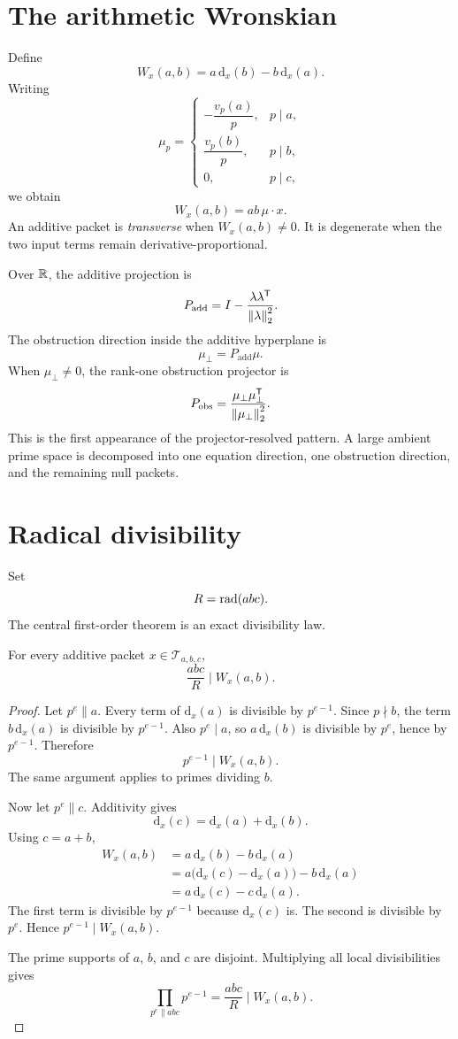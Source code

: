 \section{The arithmetic Wronskian}
Define
\[
 \boxed{
 W_x(a,b)
 =a\,\mathrm d_x(b)-b\,\mathrm d_x(a).
 }
\]
Writing
\[
 \mu_p=
 \begin{cases}
 -\dfrac{v_p(a)}p,&p\mid a,\\[6pt]
 \dfrac{v_p(b)}p,&p\mid b,\\[6pt]
 0,&p\mid c,
 \end{cases}
\]
we obtain
\[
 W_x(a,b)=ab\,\mu\cdot x.
\]
An additive packet is \emph{transverse} when $W_x(a,b)\neq0$. It is degenerate when the two input terms remain derivative-proportional.

Over $\mathbb R$, the additive projection is
\[
 P_{\mathrm{add}}
 =
 I-
 \frac{\lambda\lambda^{\mathsf T}}{\left\lVert\lambda\right\rVert_2^2}.
\]
The obstruction direction inside the additive hyperplane is
\[
 \mu_\perp=P_{\mathrm{add}}\mu.
\]
When $\mu_\perp\neq0$, the rank-one obstruction projector is
\[
 P_{\mathrm{obs}}
 =
 \frac{\mu_\perp\mu_\perp^{\mathsf T}}
 {\left\lVert\mu_\perp\right\rVert_2^2}.
\]
This is the first appearance of the projector-resolved pattern. A large ambient prime space is decomposed into one equation direction, one obstruction direction, and the remaining null packets.

\section{Radical divisibility}
Set
\[
 R=\operatorname{rad}(abc).
\]
The central first-order theorem is an exact divisibility law.

\begin{theorem}
For every additive packet $x\in\mathcal T_{a,b,c}$,
\[
 \boxed{
 \frac{abc}{R}\mid W_x(a,b).
 }
\]
\end{theorem}

\begin{proof}
Let $p^e\parallel a$. Every term of $\mathrm d_x(a)$ is divisible by $p^{e-1}$. Since $p\nmid b$, the term $b\,\mathrm d_x(a)$ is divisible by $p^{e-1}$. Also $p^e\mid a$, so $a\,\mathrm d_x(b)$ is divisible by $p^e$, hence by $p^{e-1}$. Therefore
\[
 p^{e-1}\mid W_x(a,b).
\]
The same argument applies to primes dividing $b$.

Now let $p^e\parallel c$. Additivity gives
\[
 \mathrm d_x(c)=\mathrm d_x(a)+\mathrm d_x(b).
\]
Using $c=a+b$,
\[
 \begin{aligned}
 W_x(a,b)
 &=a\,\mathrm d_x(b)-b\,\mathrm d_x(a)\\
 &=a\bigl(\mathrm d_x(c)-\mathrm d_x(a)\bigr)-b\,\mathrm d_x(a)\\
 &=a\,\mathrm d_x(c)-c\,\mathrm d_x(a).
 \end{aligned}
\]
The first term is divisible by $p^{e-1}$ because $\mathrm d_x(c)$ is. The second is divisible by $p^e$. Hence $p^{e-1}\mid W_x(a,b)$.

The prime supports of $a$, $b$, and $c$ are disjoint. Multiplying all local divisibilities gives
\[
 \prod_{p^e\parallel abc}p^{e-1}
 =
 \frac{abc}{R}
 \mid W_x(a,b).
\]
\end{proof}

